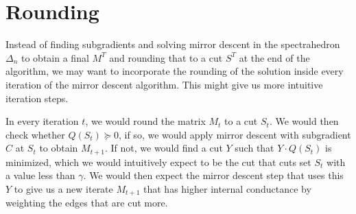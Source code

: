 \documentclass{article}
\begin{document}
% 



\section{Rounding}

Instead of finding subgradients and solving mirror descent in the spectrahedron $\Delta_n$ to obtain a final $M^T$ and rounding that to a cut $S^T$ at the end of the algorithm, we may want to incorporate the rounding of the solution inside every iteration of the mirror descent algorithm. This might give us more intuitive iteration steps.

In every iteration $t$, we would round the matrix $M_t$ to a cut $S_t$. We would then check whether $Q(S_t) \succeq 0$, if so, we would apply mirror descent with subgradient $C$ at $S_t$ to obtain $M_{t+1}$. If not, we would find a cut $Y$ such that $Y \cdot Q(S_t)$ is minimized, which we would intuitively expect to be the cut that cuts set $S_t$ with a value less than $\gamma$. We would then expect the mirror descent step that uses this $Y$ to give us a new iterate $M_{t+1}$ that has higher internal conductance by weighting the edges that are cut more.
\end{document}

